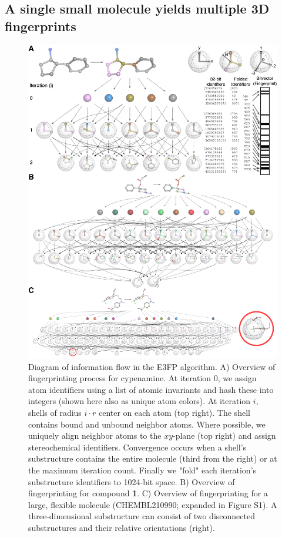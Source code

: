\documentclass[../main.tex]{subfiles}
\begin{document}
\begin{refsection}
\subsection*{A single small molecule yields multiple 3D fingerprints}

\begin{figure}%
    \centering  \includegraphics[width=13.5cm]{figures/chapter2/fig1.png}
    \caption[Diagram of information flow in the E3FP algorithm]{
        Diagram of information flow in the E3FP algorithm.
        A) Overview of fingerprinting process for cypenamine.
        At iteration 0, we assign atom identifiers using a list of atomic invariants and hash these into integers (shown here also as unique atom colors).
        At iteration $i$, shells of radius $i \cdot r$ center on each atom (top right).
        The shell contains bound and unbound neighbor atoms.
        Where possible, we uniquely align neighbor atoms to the $xy$-plane (top right) and assign stereochemical identifiers.
        Convergence occurs when a shell's substructure contains the entire molecule (third from the right) or at the maximum iteration count.
        Finally we "fold" each iteration's substructure identifiers to 1024-bit space.
        B) Overview of fingerprinting for compound \textbf{1}.
        C) Overview of fingerprinting for a large, flexible molecule (CHEMBL210990; expanded in Figure S1).
        A three-dimensional substructure can consist of two disconnected substructures and their relative orientations (right).}
    \label{fig:fig1}
\end{figure}


\end{refsection}
\end{document}
